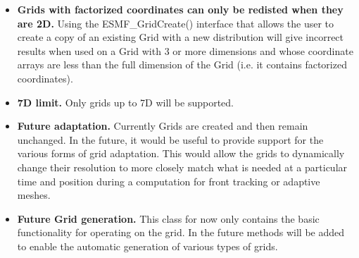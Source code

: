 

\begin{itemize}

\item {\bf Grids with factorized coordinates can only be redisted when they are 2D.}  Using the ESMF_GridCreate() interface that allows the user to create a copy of an existing Grid with a new distribution will give incorrect results when used on a Grid with 3 or more dimensions and whose coordinate arrays are less than the full dimension of the Grid (i.e. it contains factorized coordinates).

\item {\bf 7D limit.}  Only grids up to 7D will be supported.

\item {\bf Future adaptation.}  Currently Grids
are created and then remain unchanged. In the future, it would
be useful to provide support for the various forms of grid
adaptation. This would allow the grids to dynamically change
their resolution to more closely match what is needed at a particular
time and position during a computation for front tracking or adaptive meshes.


\item {\bf Future Grid generation.} This class for now only contains
the basic functionality for operating on the grid. In the future
methods will be added to enable the automatic generation of various types of
grids. 


\end{itemize}

